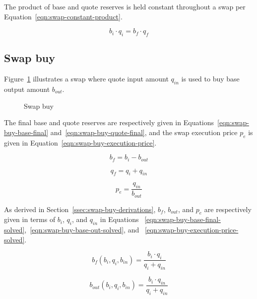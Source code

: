 \documentclass[table, twocolumn]{article}
\begin{document}
The product of base and quote reserves is held constant throughout a swap per
Equation~\ref{eqn:swap-constant-product}.

\begin{equation}\label{eqn:swap-constant-product}
	b_i \cdot q_i = b_f \cdot q_f
\end{equation}

\subsection{Swap buy}\label{ssec:swap-buy}

Figure~\ref{fig:swap-buy} illustrates a swap where quote input amount $q_{in}$ is used
to buy base output amount $b_{out}$.

\begin{figure}[!htb]
	\centering
	
	\caption{Swap buy}\label{fig:swap-buy}
\end{figure}

The final base and quote reserves are respectively given in
Equations~\ref{eqn:swap-buy-base-final} and~\ref{eqn:swap-buy-quote-final}, and the
swap execution price $p_e$ is given in Equation~\ref{eqn:swap-buy-execution-price}.

\begin{equation}\label{eqn:swap-buy-base-final}
	b_f = b_i - b_{out}
\end{equation}

\begin{equation}\label{eqn:swap-buy-quote-final}
	q_f = q_i + q_{in}
\end{equation}

\begin{equation}\label{eqn:swap-buy-execution-price}
	p_e = \frac{q_{in}}{b_{out}}
\end{equation}

As derived in Section~\ref{ssec:swap-buy-derivations}, $b_f$, $b_{out}$, and $p_e$ are
respectively given in terms of $b_i$, $q_i$, and $q_{in}$ in Equations%
~\ref{eqn:swap-buy-base-final-solved},~\ref{eqn:swap-buy-base-out-solved}, and%
~\ref{eqn:swap-buy-execution-price-solved}.

\begin{equation}\label{eqn:swap-buy-base-final-solved}
	b_f(b_i, q_i, b_{in}) = \frac{b_i \cdot q_i}{q_i + q_{in}}
\end{equation}

\begin{equation}\label{eqn:swap-buy-base-out-solved}
	b_{out} (b_i, q_i, b_{in}) = \frac{b_i \cdot q_{in}}{q_i + q_{in}}
\end{equation}
\end{document}
